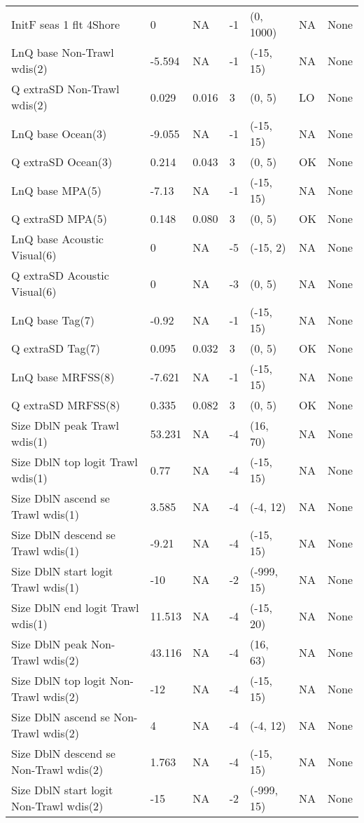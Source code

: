 \documentclass[11pt,
  english,
  letterpaper,
]{article}
\begin{document}
\begin{landscape}
\begin{longtable}[t]{>{\raggedright\arraybackslash}p{7.5cm}lllll>{\raggedright\arraybackslash}p{3.5cm}}
InitF seas 1 flt 4Shore & 0 & NA & -1 & (0, 1000) & NA & None\\
LnQ base Non-Trawl wdis(2) & -5.594 & NA & -1 & (-15, 15) & NA & None\\
Q extraSD Non-Trawl wdis(2) & 0.029 & 0.016 & 3 & (0, 5) & LO & None\\
LnQ base Ocean(3) & -9.055 & NA & -1 & (-15, 15) & NA & None\\
Q extraSD Ocean(3) & 0.214 & 0.043 & 3 & (0, 5) & OK & None\\
LnQ base MPA(5) & -7.13 & NA & -1 & (-15, 15) & NA & None\\
Q extraSD MPA(5) & 0.148 & 0.080 & 3 & (0, 5) & OK & None\\
LnQ base Acoustic Visual(6) & 0 & NA & -5 & (-15, 2) & NA & None\\
Q extraSD Acoustic Visual(6) & 0 & NA & -3 & (0, 5) & NA & None\\
LnQ base Tag(7) & -0.92 & NA & -1 & (-15, 15) & NA & None\\
Q extraSD Tag(7) & 0.095 & 0.032 & 3 & (0, 5) & OK & None\\
LnQ base MRFSS(8) & -7.621 & NA & -1 & (-15, 15) & NA & None\\
Q extraSD MRFSS(8) & 0.335 & 0.082 & 3 & (0, 5) & OK & None\\
Size DblN peak Trawl wdis(1) & 53.231 & NA & -4 & (16, 70) & NA & None\\
Size DblN top logit Trawl wdis(1) & 0.77 & NA & -4 & (-15, 15) & NA & None\\
Size DblN ascend se Trawl wdis(1) & 3.585 & NA & -4 & (-4, 12) & NA & None\\
Size DblN descend se Trawl wdis(1) & -9.21 & NA & -4 & (-15, 15) & NA & None\\
Size DblN start logit Trawl wdis(1) & -10 & NA & -2 & (-999, 15) & NA & None\\
Size DblN end logit Trawl wdis(1) & 11.513 & NA & -4 & (-15, 20) & NA & None\\
Size DblN peak Non-Trawl wdis(2) & 43.116 & NA & -4 & (16, 63) & NA & None\\
Size DblN top logit Non-Trawl wdis(2) & -12 & NA & -4 & (-15, 15) & NA & None\\
Size DblN ascend se Non-Trawl wdis(2) & 4 & NA & -4 & (-4, 12) & NA & None\\
Size DblN descend se Non-Trawl wdis(2) & 1.763 & NA & -4 & (-15, 15) & NA & None\\
Size DblN start logit Non-Trawl wdis(2) & -15 & NA & -2 & (-999, 15) & NA & None\\

\end{longtable}
\end{landscape}
\end{document}
